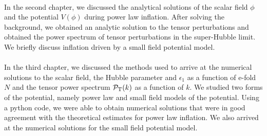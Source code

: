 \documentclass[12pt,a4paper,oneside]{book}
\begin{document}
\paragraph*{} In the second chapter, we discussed the analytical solutions of the scalar field $\phi$ and 
the potential $V(\phi)$ during power law inflation. After solving the background, we obtained an 
analytic solution to the tensor perturbations and obtained the power spectrum of tensor perturbations 
in the super-Hubble limit. We briefly discuss inflation driven by a small field potential model.

\paragraph*{} In the third chapter, we discussed the methods used to arrive at the numerical solutions 
to the scalar field, the Hubble parameter and $\epsilon_1$ as a function of e-fold $N$ and the tensor 
power spectrum $\mathcal{P}_{\rm T}(k)$ as a function of $k$. 
We studied two forms of the potential, namely power law and small field models 
of the potential. Using a python code, we were able to obtain numerical solutions that were in good agreement with the 
theoretical estimates for power law inflation. We also arrived at the numerical solutions for the small 
field potential model. 
\end{document}
